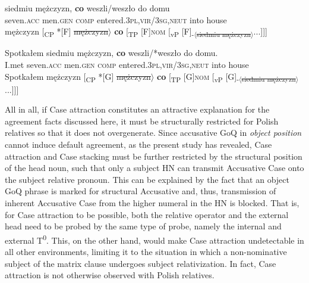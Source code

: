 \documentclass[output=paper]{langsci/langscibook}
\begin{document}
\ea%
    \label{ex:leska:33}
    \gll siedmiu   mężczyzn,   \textbf{co}   weszli/weszło     do   domu\\
         seven.\textsc{acc}   men.\textsc{gen}   \textsc{comp}   entered.\textsc{3pl,vir}/\textsc{3sg,neut} into   house \\
    \glt {} mężczyzn [\textsubscript{CP} *[F]\st{ mężczyzn}$\rangle$ \textbf{co} [\textsubscript{TP} [F]{\footnotesize\textsc{nom}} [\textsubscript{vP} [F]\textsubscript{-$\langle$\st{siedmiu mężczyzn}$\rangle$}...]]]
\z

\ea%
    \label{ex:leska:34}
    \gll Spotkałem   siedmiu   mężczyzn,   \textbf{co}   weszli/*weszło do   domu.\\
         I.met     seven.\textsc{acc}   men.\textsc{gen}   \textsc{comp} entered.\textsc{3pl,vir}/\textsc{3sg,neut} into   house\\
    \glt Spotkałem  mężczyzn [\textsubscript{CP} *[G]\st{ mężczyzn}$\rangle$ \textbf{co} [\textsubscript{TP} [G]{\footnotesize\textsc{nom}} [\textsubscript{vP} [G]\textsubscript{-$\langle$\st{siedmiu mężczyzn}$\rangle$}...]]]
\z


All in all, if Case attraction constitutes an attractive explanation for the agreement facts discussed here, it must be structurally restricted for Polish relatives so that it does not overgenerate. Since accusative GoQ in \textit{object position} cannot induce default agreement, as the present study has revealed, Case attraction and Case stacking must be further restricted by the structural position of the head noun, such that only a subject HN can transmit Accusative Case onto the subject relative pronoun. This can be explained by the fact that an object GoQ phrase is marked for structural Accusative and, thus, transmission of inherent Accusative Case from the higher numeral in the HN is blocked. That is, for Case attraction to be possible, both the relative operator and the external head need to be probed by the same type of probe, namely the internal and external T\textsuperscript{0}. This, on the other hand, would make Case attraction undetectable in all other environments, limiting it to the situation in which a non-nominative subject of the matrix clause undergoes subject relativization. In fact, Case attraction is not otherwise observed with Polish relatives. 
\end{document}
